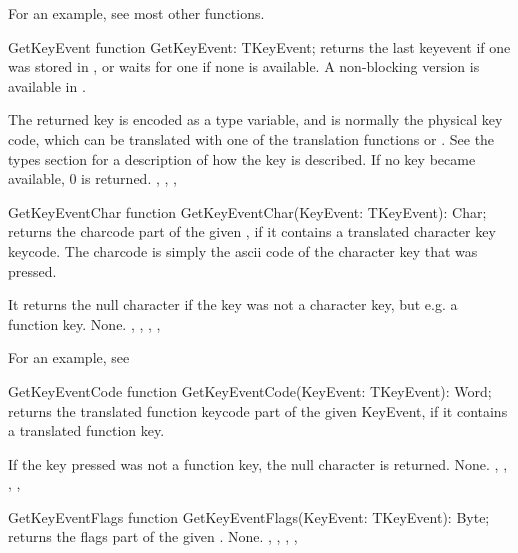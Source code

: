 For an example, see most other functions.

\begin{function}{GetKeyEvent}
\Declaration
function GetKeyEvent: TKeyEvent;
\Description
{} returns the last keyevent if one was stored in
, or waits for one if none is available.
A non-blocking version is available in .

The returned key is encoded as a  type variable, and
is normally the physical key code, which can be translated with one
of the translation functions  or
. See the types section for a 
description of how the key is described.
\Errors
If no key became available, 0 is returned.
\SeeAlso
{}, , ,
\end{function}


\begin{function}{GetKeyEventChar}
\Declaration
function GetKeyEventChar(KeyEvent: TKeyEvent): Char;
\Description
{} returns the charcode part of the given 
, if it contains a translated character key 
keycode. The charcode is simply the ascii code of the 
character key that was pressed.

It returns the null character if the key was not a character key, but e.g. a
function key.
\Errors
None.
\SeeAlso
{},
, 
,
,
\end{function}

For an example, see 

\begin{function}{GetKeyEventCode}
\Declaration
function GetKeyEventCode(KeyEvent: TKeyEvent): Word;
\Description
{} returns the translated function keycode part of 
the given KeyEvent, if it contains a translated function key.

If the key pressed was not a function key, the null character is returned.
\Errors
None.
\SeeAlso
{},
, 
,
,
\end{function}


\begin{function}{GetKeyEventFlags}
\Declaration
function GetKeyEventFlags(KeyEvent: TKeyEvent): Byte;
\Description
{} returns the flags part of the given 
. 
\Errors
None.
\SeeAlso
{},
, 
,
,
\end{function}

